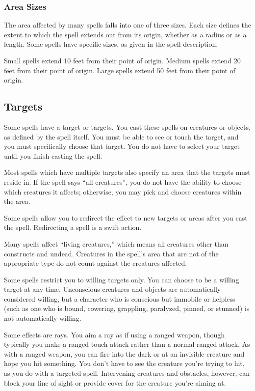 \subsubsection{Area Sizes}

The area affected by many spells falls into one of three sizes. Each size defines the extent to which the spell extends out from its origin, whether as a radius or as a length. Some spells have specific sizes, as given in the spell description.

 Small spells extend 10 feet from their point of origin.
 Medium spells extend 20 feet from their point of origin.
 Large spells extend 50 feet from their point of origin.

\subsection{Targets}
Some spells have a target or targets. You cast these spells on creatures or objects, as defined by the spell itself. You must be able to see or touch the target, and you must specifically choose that target. You do not have to select your target until you finish casting the spell.

 Most spells which have multiple targets also specify an area that the targets must reside in. If the spell says ``all creatures'', you do not have the ability to choose which creatures it affects; otherwise, you may pick and choose creatures within the area.

 Some spells allow you to redirect the effect to new targets or areas after you cast the spell. Redirecting a spell is a swift action.

 Many spells affect ``living creatures,'' which means all creatures other than constructs and undead. Creatures in the spell's area that are not of the appropriate type do not count against the creatures affected.

 Some spells restrict you to willing targets only. You can choose to be a willing target at any time. Unconscious creatures and objects are automatically considered willing, but a character who is conscious but immobile or helpless (such as one who is bound, cowering, grappling, paralyzed, pinned, or stunned) is not automatically willing.

 Some effects are rays. You aim a ray as if using a ranged weapon, though typically you make a ranged touch attack rather than a normal ranged attack. As with a ranged weapon, you can fire into the dark or at an invisible creature and hope you hit something. You don't have to see the creature you're trying to hit, as you do with a targeted spell. Intervening creatures and obstacles, however, can block your line of sight or provide cover for the creature you're aiming at.


